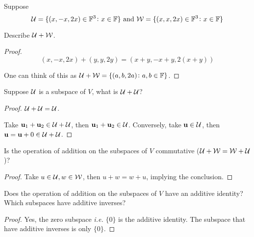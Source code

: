 \documentclass{extarticle}
\begin{document}


\begin{problem}{14}

    Suppose 
    \[\mathcal{U} = \{(x, -x, 2x)\in \mathbb{F}^3 \colon x \in \mathbb{F}\} \text{ and } \mathcal{W} =\{(x, x, 2x) \in \mathbb{F}^3 \colon x \in \mathbb{F}\}\]

Describe \(\mathcal{U} + \mathcal{W}\).
    
\end{problem}

\begin{proof}
\[(x, -x, 2x) + (y, y, 2y) = (x + y, -x + y, 2(x + y))\]

One can think of this as \(\mathcal{U} + \mathcal{W} = \{(a, b, 2a) \colon a,b \in \mathbb{F}\}\). 
\end{proof}

\begin{problem}{15}
    Suppose \(\mathcal{U}\) is a subspace of \(V\), what is \(\mathcal{U} + \mathcal{U}\)?
\end{problem}

\begin{proof}
\(\mathcal{U} + \mathcal{U} = \mathcal{U}\). 

Take \(\mathbf{u}_1 + \mathbf{u}_2 \in \mathcal{U} + \mathcal{U}\), then \(\mathbf{u}_1 + \mathbf{u}_2 \in \mathcal{U}\). Conversely,
take \(\mathbf{u} \in \mathcal{U}\), then \(\mathbf{u} = \mathbf{u} + 0 \in \mathcal{U} + \mathcal{U}\).
\end{proof}


\begin{problem}{16}
    Is the operation of addition on the subspaces of \(V\) commutative (\(\mathcal{U} +
    \mathcal{W} = \mathcal{W} + \mathcal{U}\))? 
\end{problem}

\begin{proof}
Take \(u \in \mathcal{U}, w \in \mathcal{W}\), then \(u + w = w + u\), implying the conclusion. 
\end{proof}

\begin{problem}{18}
    Does the operation of addition on the subspaces of \(V\) have an additive 
    identity? Which subspaces have additive inverses?
\end{problem}

\begin{proof}
Yes, the zero subspace \emph{i.e.} \(\{0\}\) is the additive identity. The subspace
that have additive inverses is only \(\{0\}\). 
\end{proof}
\end{document}
